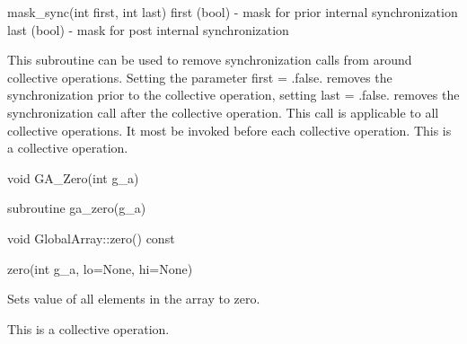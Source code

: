 \documentclass[12pt]{article}
\begin{document}
\begin{pyapi}
\begin{pycode}
mask_sync(int first, int last)
   first (bool)   - mask for prior internal synchronization
   last (bool)    - mask for post internal synchronization
\end{pycode}
\end{pyapi}

\begin{desc}

This subroutine can be used to remove synchronization calls from around collective
operations. Setting the parameter first = .false. removes the synchronization prior
to the collective operation, setting last = .false. removes the synchronization call
after the collective operation. This call is applicable to all collective operations. 
It most be invoked before each collective operation.
This is a  collective operation.

\end{desc}


\begin{capi}
\begin{ccode}
void GA_Zero(int g_a)
\end{ccode}
\begin{funcargs}
\end{funcargs}
\end{capi}

\begin{fapi}
\begin{fcode}
subroutine ga_zero(g_a)
\end{fcode}
\begin{funcargs}
\end{funcargs}
\end{fapi}

\begin{cxxapi}
\begin{cxxcode}
void GlobalArray::zero() const
\end{cxxcode}
\end{cxxapi}

\begin{pyapi}
\begin{pycode}
zero(int g_a, lo=None, hi=None)
\end{pycode}
\end{pyapi}

\begin{desc}

Sets value of all elements in the array to zero.

This is a collective operation.

\end{desc}
\end{document}
